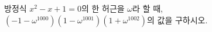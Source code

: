 방정식 $x^2-x+1=0$의 한 허근을 $\omega$라 할 때, $(-1-\omega^{1000})(1-\omega^{1001})(1+\omega^{1002})$의 값을 구하시오.
